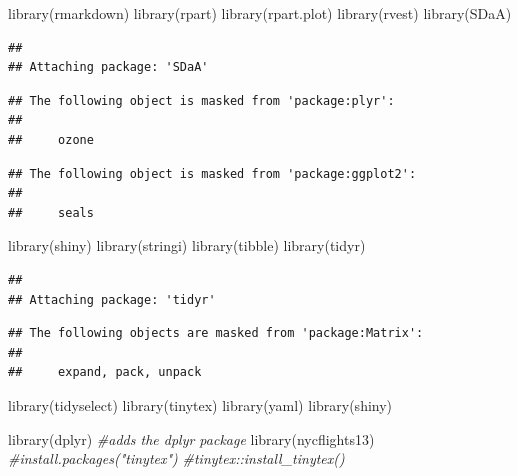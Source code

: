 \documentclass[
]{article}
\newenvironment{Shaded}{\begin{snugshade}}{\end{snugshade}}
\newcommand{\CommentTok}[1]{\textcolor[rgb]{0.56,0.35,0.01}{\textit{#1}}}
\newcommand{\FunctionTok}[1]{\textcolor[rgb]{0.00,0.00,0.00}{#1}}
\newcommand{\NormalTok}[1]{#1}
\begin{document}
\begin{Shaded}
\begin{Highlighting}[]
\FunctionTok{library}\NormalTok{(rmarkdown)}
\FunctionTok{library}\NormalTok{(rpart)}
\FunctionTok{library}\NormalTok{(rpart.plot)}
\FunctionTok{library}\NormalTok{(rvest)}
\FunctionTok{library}\NormalTok{(SDaA)}
\end{Highlighting}
\end{Shaded}

\begin{verbatim}
## 
## Attaching package: 'SDaA'
\end{verbatim}

\begin{verbatim}
## The following object is masked from 'package:plyr':
## 
##     ozone
\end{verbatim}

\begin{verbatim}
## The following object is masked from 'package:ggplot2':
## 
##     seals
\end{verbatim}

\begin{Shaded}
\begin{Highlighting}[]
\FunctionTok{library}\NormalTok{(shiny)}
\FunctionTok{library}\NormalTok{(stringi)}
\FunctionTok{library}\NormalTok{(tibble)}
\FunctionTok{library}\NormalTok{(tidyr)}
\end{Highlighting}
\end{Shaded}

\begin{verbatim}
## 
## Attaching package: 'tidyr'
\end{verbatim}

\begin{verbatim}
## The following objects are masked from 'package:Matrix':
## 
##     expand, pack, unpack
\end{verbatim}

\begin{Shaded}
\begin{Highlighting}[]
\FunctionTok{library}\NormalTok{(tidyselect)}
\FunctionTok{library}\NormalTok{(tinytex)}
\FunctionTok{library}\NormalTok{(yaml)}
\FunctionTok{library}\NormalTok{(shiny)}
\end{Highlighting}
\end{Shaded}

\begin{Shaded}
\begin{Highlighting}[]
\FunctionTok{library}\NormalTok{(dplyr)  }\CommentTok{\#adds the dplyr package}
\FunctionTok{library}\NormalTok{(nycflights13)}
\CommentTok{\#install.packages("tinytex")}
\CommentTok{\#tinytex::install\_tinytex()}
\end{Highlighting}
\end{Shaded}
\end{document}
